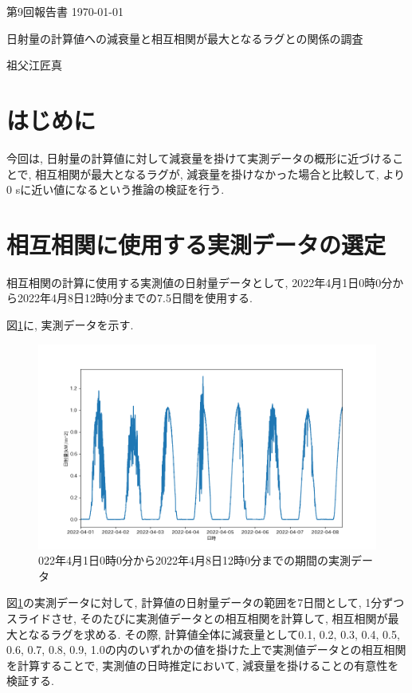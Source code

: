 \documentclass[a4j,12pt,]{jarticle}
\begin{document}
{\noindent\small 第9回報告書 \hfill\today}
\begin{center}
  {\Large 日射量の計算値への減衰量と相互相関が最大となるラグとの関係の調査}
\end{center}
\begin{flushright}
  祖父江匠真 \\
\end{flushright}

\section{はじめに}
今回は, 日射量の計算値に対して減衰量を掛けて実測データの概形に近づけることで, 相互相関が最大となるラグが, 減衰量を掛けなかった場合と比較して, より0 \si{\second}に近い値になるという推論の検証を行う.

\section{相互相関に使用する実測データの選定}
相互相関の計算に使用する実測値の日射量データとして, 2022年4月1日0時0分から2022年4月8日12時0分までの7.5日間を使用する.

図\ref{p1}に, 実測データを示す.

\begin{figure}[H]
  \begin{center}
    \includegraphics[width=160mm]{1.png}
    \caption{022年4月1日0時0分から2022年4月8日12時0分までの期間の実測データ}
    \label{p1}
  \end{center}
\end{figure}

図\ref{p1}の実測データに対して, 計算値の日射量データの範囲を7日間として, 1分ずつスライドさせ, そのたびに実測値データとの相互相関を計算して, 相互相関が最大となるラグを求める.
その際, 計算値全体に減衰量として0.1, 0.2, 0.3, 0.4, 0.5, 0.6, 0.7, 0.8, 0.9, 1.0の内のいずれかの値を掛けた上で実測値データとの相互相関を計算することで, 実測値の日時推定において, 減衰量を掛けることの有意性を検証する.
\end{document}
